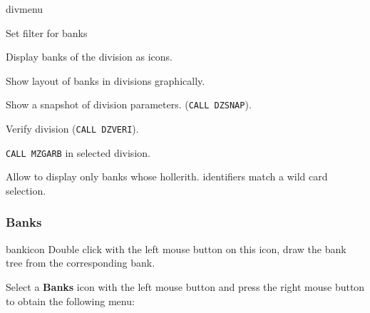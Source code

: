 \begin{PAWf}{divmenu}
\begin{DLsf}{Set filter for banks}
\item[List]                      Display banks of the division as icons.
\item[Display division]          Show layout of banks in divisions graphically.
\item[Snap division]             Show a snapshot of division parameters.
                                 (\texttt{CALL DZSNAP}).
\item[Verify division]           Verify division (\texttt{CALL DZVERI}).
\item[Collect garbage]           \texttt{CALL MZGARB} in selected division.
\item[Set filter for banks]      Allow to display only banks whose hollerith.
                                 identifiers  match a wild card selection.
\end{DLsf}
\end{PAWf}

\subsubsection{\ZEBRA{} Banks}
\begin{ICON}{bankicon}
Double click with the left mouse button on this icon, draw the bank tree from
the corresponding \ZEBRA{} bank.
\end{ICON}

Select a {\bf \ZEBRA{} Banks} icon with the left mouse button and press
the right mouse button to obtain the following menu:

